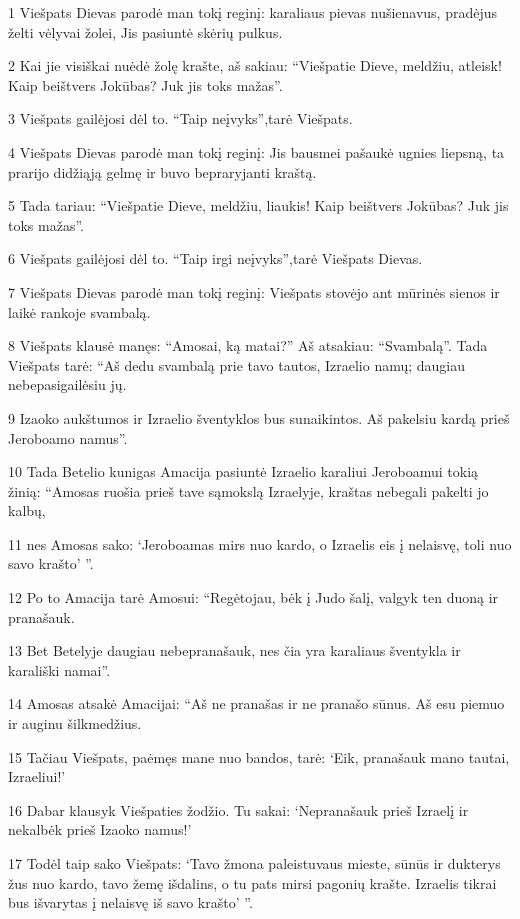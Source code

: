 \par 1 Viešpats Dievas parodė man tokį reginį: karaliaus pievas nušienavus, pradėjus želti vėlyvai žolei, Jis pasiuntė skėrių pulkus. 
\par 2 Kai jie visiškai nuėdė žolę krašte, aš sakiau: “Viešpatie Dieve, meldžiu, atleisk! Kaip beištvers Jokūbas? Juk jis toks mažas”. 
\par 3 Viešpats gailėjosi dėl to. “Taip neįvyks”,­tarė Viešpats. 
\par 4 Viešpats Dievas parodė man tokį reginį: Jis bausmei pašaukė ugnies liepsną, ta prarijo didžiąją gelmę ir buvo bepraryjanti kraštą. 
\par 5 Tada tariau: “Viešpatie Dieve, meldžiu, liaukis! Kaip beištvers Jokūbas? Juk jis toks mažas”. 
\par 6 Viešpats gailėjosi dėl to. “Taip irgi neįvyks”,­tarė Viešpats Dievas. 
\par 7 Viešpats Dievas parodė man tokį reginį: Viešpats stovėjo ant mūrinės sienos ir laikė rankoje svambalą. 
\par 8 Viešpats klausė manęs: “Amosai, ką matai?” Aš atsakiau: “Svambalą”. Tada Viešpats tarė: “Aš dedu svambalą prie tavo tautos, Izraelio namų; daugiau nebepasigailėsiu jų. 
\par 9 Izaoko aukštumos ir Izraelio šventyklos bus sunaikintos. Aš pakelsiu kardą prieš Jeroboamo namus”. 
\par 10 Tada Betelio kunigas Amacija pasiuntė Izraelio karaliui Jeroboamui tokią žinią: “Amosas ruošia prieš tave sąmokslą Izraelyje, kraštas nebegali pakelti jo kalbų, 
\par 11 nes Amosas sako: ‘Jeroboamas mirs nuo kardo, o Izraelis eis į nelaisvę, toli nuo savo krašto’ ”. 
\par 12 Po to Amacija tarė Amosui: “Regėtojau, bėk į Judo šalį, valgyk ten duoną ir pranašauk. 
\par 13 Bet Betelyje daugiau nebepranašauk, nes čia yra karaliaus šventykla ir karališki namai”. 
\par 14 Amosas atsakė Amacijai: “Aš ne pranašas ir ne pranašo sūnus. Aš esu piemuo ir auginu šilkmedžius. 
\par 15 Tačiau Viešpats, paėmęs mane nuo bandos, tarė: ‘Eik, pranašauk mano tautai, Izraeliui!’ 
\par 16 Dabar klausyk Viešpaties žodžio. Tu sakai: ‘Nepranašauk prieš Izraelį ir nekalbėk prieš Izaoko namus!’ 
\par 17 Todėl taip sako Viešpats: ‘Tavo žmona paleistuvaus mieste, sūnūs ir dukterys žus nuo kardo, tavo žemę išdalins, o tu pats mirsi pagonių krašte. Izraelis tikrai bus išvarytas į nelaisvę iš savo krašto’ ”.




